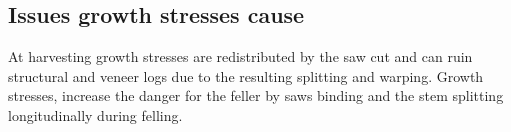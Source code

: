 \subsection{Issues growth stresses cause }

At harvesting growth stresses are redistributed by the saw cut
and can ruin structural and veneer logs due to the resulting splitting and
warping. Growth stresses, increase the
danger for the feller by saws binding and the stem splitting longitudinally during felling.